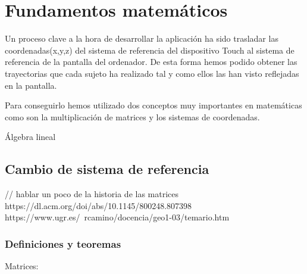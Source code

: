 \documentclass[a4paper,11pt, oneside]{book}
\begin{document}
\chapter{Fundamentos matemáticos}

Un proceso clave a la hora de desarrollar la aplicación ha sido trasladar las coordenadas(x,y,z) del sistema de referencia del dispositivo Touch al sistema de referencia de la pantalla del ordenador. De esta forma hemos podido obtener las trayectorias que cada sujeto ha realizado tal y como ellos las han visto reflejadas en la pantalla. 

Para conseguirlo hemos utilizado dos conceptos muy importantes en matemáticas como son la multiplicación de matrices y los sistemas de coordenadas.

Álgebra lineal
\section{Cambio de sistema de referencia}

// hablar un poco de la historia de las matrices
https://dl.acm.org/doi/abs/10.1145/800248.807398
https://www.ugr.es/~rcamino/docencia/geo1-03/temario.htm

\subsection{Definiciones y teoremas}
Matrices:  
\newtheorem{sistema_generadores}{Definición}
\newtheorem{base}{Definición}
\newtheorem{propiedades_afin}{Proposición}
\newtheorem{comb_lineal}{Definición}
\newtheorem{linealmente_indep}{Definición}
\newtheorem{afin_inde}{Definición}
\newtheorem{sist_referencia}{Definición}
\newtheorem{grupo}{Definición}
\newtheorem{anillo}{Definición}
\newtheorem{cuerpo}{Definición}
\newtheorem{espacio_vectorial}{Definición}
\newtheorem{espacio_afin}{Definición}
\newtheorem{prop_cambio_de_base}{Proposición}
\newtheorem{cambio_de_base}{Definición}
\newtheorem{cambio_sist_ref}{Proposición}
\newtheorem{def_asignacion}{Definición}
\newtheorem{matriz_cambio_sist_referencia}{Proposición}
\end{document}
